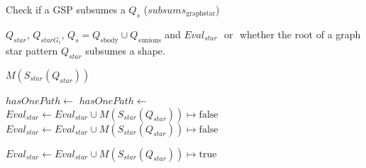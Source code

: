 \begin{algorithm}[h]
    \caption{Check if a GSP subsumes a $Q_s$ ($subsums_{\mathrm{graph star}}$)}\label{alg:containmentTree}
    \begin{algorithmic}
       \scriptsize
 
       \REQUIRE  $Q_{star}$, $Q_{starG_i}$, $Q_s = Q_{s\mathrm{body}} \cup Q_{s\mathrm{unions}}$ and $Eval_{star}$
       \ENSURE \TRUE $ $ or \FALSE $ $ whether the root of a graph star pattern $Q_{star}$ subsumes a shape.
 
          \RETURN $M(S_{star}(Q_{star}))$
       \ENDIF 
 
             \STATE $hasOnePath \gets $ \FALSE
                   \STATE $hasOnePath \gets $ \TRUE
                \ENDIF
             \ENDFOR
             \STATE $Eval_{star} \gets Eval_{star} \cup M(S_{star}(Q_{star})) \mapsto \mathrm{false}$
                \RETURN \FALSE
             \ENDIF
          \ELSE
                  \STATE $Eval_{star} \gets Eval_{star} \cup M(S_{star}(Q_{star})) \mapsto \mathrm{false}$
                   \RETURN \FALSE
                \ENDIF
             \ENDIF
          \ENDIF
       \ENDFOR
 
       \STATE $Eval_{star} \gets Eval_{star} \cup M(S_{star}(Q_{star})) \mapsto \mathrm{true}$
       \RETURN \TRUE
    \end{algorithmic}
 \end{algorithm}